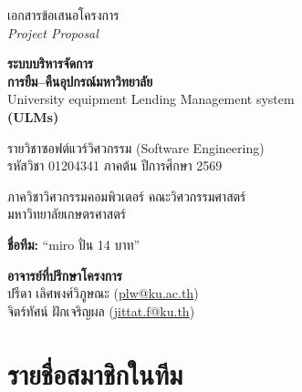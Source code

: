 \begin{titlepage}
\centering
\thispagestyle{empty}

\vspace*{1.2cm}

{\large เอกสารข้อเสนอโครงการ}\\[2pt]
{\large\itshape Project Proposal}

\vspace{1.6cm}

{\color{kugreen}\bfseries\Huge ระบบบริหารจัดการ\\[6pt]
การยืม–คืนอุปกรณ์มหาวิทยาลัย}\\[14pt]
{\Large University equipment Lending Management system}\\[8pt]
{\LARGE\bfseries (ULMs)}

\vspace{1.0cm}


\vspace{1.8cm}

{\large รายวิชาซอฟต์แวร์วิศวกรรม (Software Engineering)}\\[4pt]
{\large รหัสวิชา 01204341 \quad ภาคต้น ปีการศึกษา 2569}

\vspace{0.8cm}

{\large ภาควิชาวิศวกรรมคอมพิวเตอร์ คณะวิศวกรรมศาสตร์}\\[4pt]
{\large มหาวิทยาลัยเกษตรศาสตร์}

\vspace{1.4cm}

{\large\bfseries ชื่อทีม:} {\large ``miro ปั่น 14 บาท''}

\vspace{1.2cm}

{\large\bfseries อาจารย์ที่ปรึกษาโครงการ}\\[4pt]
{\large ปรีดา เลิศพงศ์วิภูษณะ \; (\href{mailto:plw@ku.ac.th}{plw@ku.ac.th})}\\[2pt]
{\large จิตร์ทัศน์ ฝักเจริญผล \; (\href{mailto:jittat.f@ku.th}{jittat.f@ku.th})}
    
\vfill
\end{titlepage}

\section*{รายชื่อสมาชิกในทีม}

